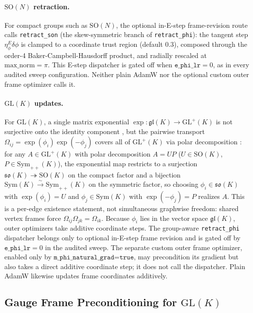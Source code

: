 \documentclass[twoside,11pt]{article}
\begin{document}
\paragraph{$\mathrm{SO}(N)$ retraction.} For compact groups such as $\mathrm{SO}(N)$, the optional in-E-step frame-revision route calls \texttt{retract\_son} (the skew-symmetric branch of \texttt{retract\_phi}): the tangent step $\eta_\phi^E\delta\phi$ is clamped to a coordinate trust region (default $0.3$), composed through the order-4 Baker-Campbell-Hausdorff product, and radially rescaled at $\mathrm{max\_norm}=\pi$. This E-step dispatcher is gated off when $\texttt{e\_phi\_lr}=0$, as in every audited sweep configuration. Neither plain AdamW nor the optional custom outer frame optimizer calls it.

\paragraph{$\mathrm{GL}(K)$ updates.} For $\mathrm{GL}(K)$, a single matrix exponential $\exp: \mathfrak{gl}(K) \to \mathrm{GL}^+(K)$ is not surjective onto the identity component \citep{culver1966existence}, but the pairwise transport $\Omega_{ij} = \exp(\phi_i)\exp(-\phi_j)$ covers all of $\mathrm{GL}^+(K)$ via polar decomposition \citep[\S8]{Higham2008}: for any $A \in \mathrm{GL}^+(K)$ with polar decomposition $A = UP$ ($U \in \mathrm{SO}(K)$, $P \in \mathrm{Sym}_{++}(K)$), the exponential map restricts to a surjection $\mathfrak{so}(K) \twoheadrightarrow \mathrm{SO}(K)$ on the compact factor and a bijection $\mathrm{Sym}(K) \xrightarrow{\sim} \mathrm{Sym}_{++}(K)$ on the symmetric factor, so choosing $\phi_i \in \mathfrak{so}(K)$ with $\exp(\phi_i) = U$ and $\phi_j \in \mathrm{Sym}(K)$ with $\exp(-\phi_j) = P$ realizes $A$. This is a per-edge existence statement, not simultaneous graphwise freedom: shared vertex frames force $\Omega_{ij}\Omega_{jk}=\Omega_{ik}$. Because $\phi_i$ lies in the vector space $\mathfrak{gl}(K)$, outer optimizers take additive coordinate steps. The group-aware \texttt{retract\_phi} dispatcher belongs only to optional in-E-step frame revision and is gated off by $\texttt{e\_phi\_lr}=0$ in the audited sweep. The separate custom outer frame optimizer, enabled only by $\texttt{m\_phi\_natural\_grad=true}$, may precondition its gradient but also takes a direct additive coordinate step; it does not call the dispatcher. Plain AdamW likewise updates frame coordinates additively.

\subsection{Gauge Frame Preconditioning for $\mathrm{GL}(K)$}
\label{sec:glk_preconditioning}
\end{document}
